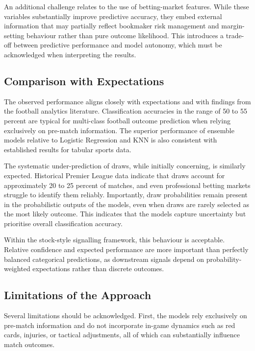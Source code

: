 \documentclass[11pt,a4paper]{article}
\begin{document}
An additional challenge relates to the use of betting-market features. While these variables substantially improve predictive accuracy, they embed external information that may partially reflect bookmaker risk management and margin-setting behaviour rather than pure outcome likelihood. This introduces a trade-off between predictive performance and model autonomy, which must be acknowledged when interpreting the results.

\subsection{Comparison with Expectations}

The observed performance aligns closely with expectations and with findings from the football analytics literature. Classification accuracies in the range of 50 to 55 percent are typical for multi-class football outcome prediction when relying exclusively on pre-match information. The superior performance of ensemble models relative to Logistic Regression and KNN is also consistent with established results for tabular sports data.

The systematic under-prediction of draws, while initially concerning, is similarly expected. Historical Premier League data indicate that draws account for approximately 20 to 25 percent of matches, and even professional betting markets struggle to identify them reliably. Importantly, draw probabilities remain present in the probabilistic outputs of the models, even when draws are rarely selected as the most likely outcome. This indicates that the models capture uncertainty but prioritise overall classification accuracy.

Within the stock-style signalling framework, this behaviour is acceptable. Relative confidence and expected performance are more important than perfectly balanced categorical predictions, as downstream signals depend on probability-weighted expectations rather than discrete outcomes.

\subsection{Limitations of the Approach}

Several limitations should be acknowledged. First, the models rely exclusively on pre-match information and do not incorporate in-game dynamics such as red cards, injuries, or tactical adjustments, all of which can substantially influence match outcomes.
\end{document}
